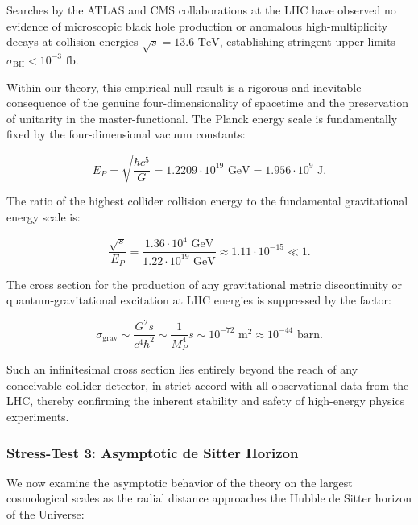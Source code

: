 \documentclass[11pt,a4paper]{article}
\theoremstyle{definition}
\begin{document}
Searches by the ATLAS and CMS collaborations at the LHC have observed no evidence of microscopic black hole production or anomalous high-multiplicity decays at collision energies $\sqrt{s} = 13.6\text{ TeV}$, establishing stringent upper limits $\sigma_{\text{BH}} < 10^{-3}\text{ fb}$.

Within our theory, this empirical null result is a rigorous and inevitable consequence of the genuine four-dimensionality of spacetime and the preservation of unitarity in the master-functional. The Planck energy scale is fundamentally fixed by the four-dimensional vacuum constants:

\begin{equation}\label{eq:5.60}\tag{5.60}
E_P = \sqrt{\frac{\hbar c^5}{G}} = 1.2209 \cdot 10^{19}\text{ GeV} = 1.956 \cdot 10^9\text{ J}.
\end{equation}

The ratio of the highest collider collision energy to the fundamental gravitational energy scale is:

\begin{equation}\label{eq:5.61}\tag{5.61}
\frac{\sqrt{s}}{E_P} = \frac{1.36 \cdot 10^4\text{ GeV}}{1.22 \cdot 10^{19}\text{ GeV}} \approx 1.11 \cdot 10^{-15} \ll 1.
\end{equation}

The cross section for the production of any gravitational metric discontinuity or quantum-gravitational excitation at LHC energies is suppressed by the factor:

\begin{equation}\label{eq:5.62}\tag{5.62}
\sigma_{\text{grav}} \sim \frac{G^2 s}{c^4 \hbar^2} \sim \frac{1}{M_P^4} s \sim 10^{-72}\text{ m}^2 \approx 10^{-44}\text{ barn}.
\end{equation}

Such an infinitesimal cross section lies entirely beyond the reach of any conceivable collider detector, in strict accord with all observational data from the LHC, thereby confirming the inherent stability and safety of high-energy physics experiments.

\subsubsection{Stress-Test 3: Asymptotic de Sitter Horizon}\label{sec:5.4.3}

We now examine the asymptotic behavior of the theory on the largest cosmological scales as the radial distance approaches the Hubble de Sitter horizon of the Universe:
\end{document}
